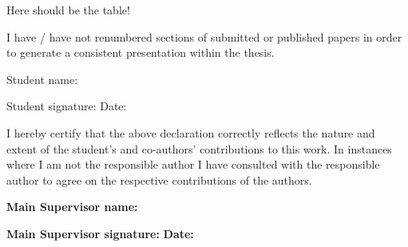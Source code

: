 {Here should be the table!

I have / have not renumbered sections of submitted or published papers
in order to generate a consistent presentation within the thesis.

Student name:

Student signature: Date:

I hereby certify that the above declaration correctly reflects the
nature and extent of the student's and co-authors' contributions to this
work. In instances where I am not the responsible author I have
consulted with the responsible author to agree on the respective
contributions of the authors.

\textbf{Main Supervisor name:}

\textbf{Main Supervisor signature:} \textbf{Date:}


}